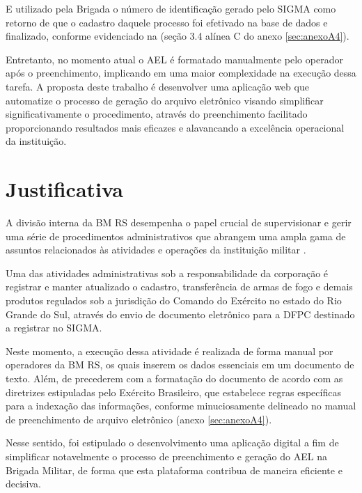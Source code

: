 E utilizado pela Brigada o número de identificação gerado pelo SIGMA como retorno de que o cadastro daquele processo foi efetivado na base de dados e finalizado, conforme evidenciado na (seção 3.4 alínea C do anexo \ref{sec:anexoA4}).

Entretanto, no momento atual o AEL é formatado manualmente pelo operador após o preenchimento, implicando em uma maior complexidade na execução dessa tarefa. A proposta deste trabalho é desenvolver uma aplicação web que automatize o processo de geração do arquivo eletrônico visando simplificar significativamente o procedimento, através do preenchimento facilitado proporcionando resultados mais eficazes e alavancando a excelência operacional da instituição.


\section{Justificativa}

A divisão interna da BM RS desempenha o papel crucial de supervisionar e gerir uma série de procedimentos administrativos que abrangem uma ampla gama de assuntos relacionados às atividades e operações da instituição militar \cite{bmDepartamentoAdministrativo}.

Uma das atividades administrativas sob a responsabilidade da corporação é registrar e manter atualizado o cadastro, transferência de armas de fogo e demais produtos regulados sob a jurisdição do Comando do Exército no estado do Rio Grande do Sul, através do envio de documento eletrônico para a DFPC destinado a registrar no SIGMA\cite{ExércitoBrasileiro}.

Neste momento, a execução dessa atividade é realizada de forma manual por operadores da BM RS, os quais inserem os dados essenciais em um documento de texto. Além, de precederem com a formatação do documento de acordo com as diretrizes estipuladas pelo Exército Brasileiro, que estabelece regras específicas para a indexação das informações, conforme minuciosamente delineado no manual de preenchimento de arquivo eletrônico (anexo \ref{sec:anexoA4}). 

Nesse sentido, foi estipulado o desenvolvimento uma aplicação digital a fim de simplificar notavelmente o processo de preenchimento e geração do AEL na Brigada Militar, de forma que esta plataforma contribua de maneira eficiente e decisiva.

